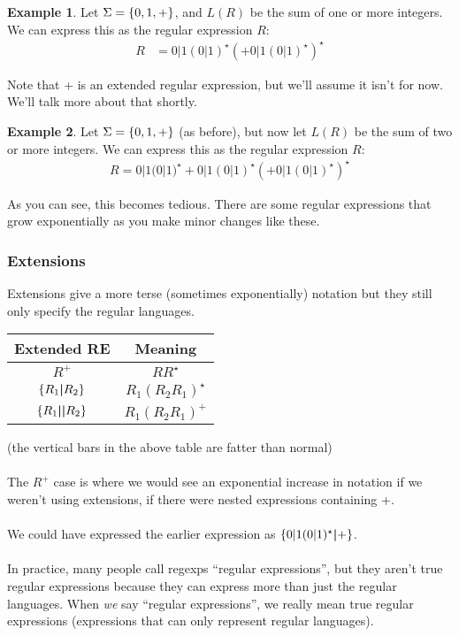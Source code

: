 \documentclass[]{article}
\DeclarePairedDelimiter{\set}{\lbrace}{\rbrace}
\theoremstyle{definition}
\newtheorem{ex}{Example}[section]
\begin{document}
			\begin{ex}
				Let $\Sigma = \set{0, 1, +}$, and $L(R)$ be the sum of one or more integers. We can express this as the regular expression $R$:
				\begin{align*}
					R &= 0 | 1 (0 | 1)^\star{} (+ 0|1(0|1)^\star{})^\star
				\end{align*}

				Note that + is an extended regular expression, but we'll assume it isn't for now. We'll talk more about that shortly.
			\end{ex}

			\begin{ex}
				Let $\Sigma = \set{0, 1, +}$ (as before), but now let $L(R)$ be the sum of two or more integers. We can express this as the regular expression $R$:
				\begin{align*}
					R = 0|1(0|1)^\star{} + 0|1(0|1)^\star{} (+ 0|1(0|1)^\star{})^\star
				\end{align*}

				As you can see, this becomes tedious. There are some regular expressions that grow exponentially as you make minor changes like these.
			\end{ex}

			\subsubsection{Extensions}
				Extensions give a more terse (sometimes exponentially) notation but they still only specify the regular languages.
				
				\begin{center}
					\begin{tabular}{c|c}
						Extended RE & Meaning \\ \hline
						$R^+$ & $RR^\star$ \\
						$\set{R_1 \text{\textbf{|}} R_2}$ & $R_1(R_2R_1)^\star$ \\
						$\set{R_1 \text{\textbf{||}} R_2}$ & $R_1(R_2R_1)^+$
					\end{tabular}
				\end{center}
				(the vertical bars in the above table are fatter than normal)
				\\ \\
				The $R^+$ case is where we would see an exponential increase in notation if we weren't using extensions, if there were nested expressions containing +.
				\\ \\
				We could have expressed the earlier expression as $\set{0|1(0|1)^\star{} \text{\textbf{|}} +}$.
				\\ \\
				In practice, many people call regexps ``regular expressions'', but they aren't true regular expressions because they can express more than just the regular languages. When \emph{we} say ``regular expressions'', we really mean true regular expressions (expressions that can only represent regular languages).
			
\end{document}
